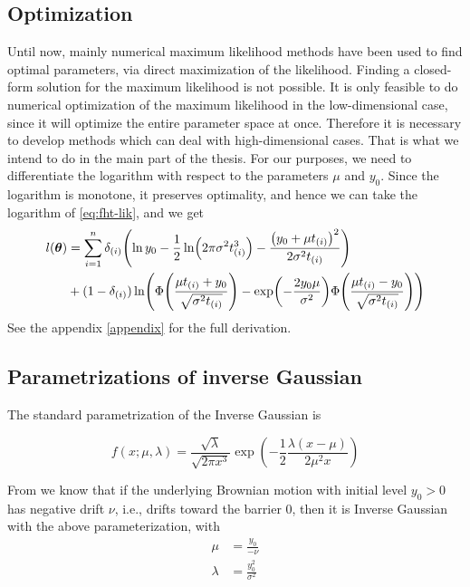 \subsection{Optimization}
Until now, mainly numerical maximum likelihood methods have been used to find optimal parameters, via direct maximization of the likelihood. Finding a closed-form solution for the maximum likelihood is not possible. It is only feasible to do numerical optimization of the maximum likelihood in the low-dimensional case, since it will optimize the entire parameter space at once. Therefore it is necessary to develop methods which can deal with high-dimensional cases. That is what we intend to do in the main part of the thesis. For our purposes, we need to differentiate the logarithm with respect to the parameters $\mu$ and $y_0$. Since the logarithm is monotone, it preserves optimality, and hence we can take the logarithm of \eqref{eq:fht-lik}, and we get
\begin{align}\label{eq:loglik}
\begin{split}
    l(\btheta)&=\sum_{i=1}^n\di\p*{\ln y_0-\frac{1}{2}\ln\p*{2\pi\sigma^2\ti^3}-\frac{\p*{y_0+\mu\ti}^2}{2\sigma^2\ti}} \\
    &+
    (1-\di)\ln\p*{\Phi\p*{\frac{\mu\ti+y_0}{\sqrt{\sigma^2\ti}}}-\exp\p*{-\frac{2y_0\mu}{\sigma^2}}\Phi\p*{\frac{\mu\ti-y_0}{\sqrt{\sigma^2\ti}}}}
\end{split}
\end{align}
See the appendix \ref{appendix} for the full derivation.



\subsection{Parametrizations of inverse Gaussian}
The standard parametrization of the Inverse Gaussian is

\begin{equation*}
    f(x;\mu,\lambda)=
    \frac{\sqrt{\lambda}}{\sqrt{2\pi x^3}}\exp\left(-\frac{1}{2}\frac{\lambda(x-\mu)}{2\mu^2x}\right)
\end{equation*}

From \citet{chhikara1988} we know that if the underlying Brownian motion with initial level $y_0>0$ has negative drift $\nu$, i.e., drifts toward the barrier 0, then it is Inverse Gaussian with the above parameterization, with
\begin{align*}
    \mu&=\frac{y_0}{-\nu} \\
    \lambda&=\frac{y_0^2}{\sigma^2}
\end{align*}